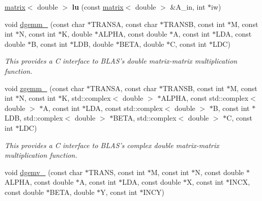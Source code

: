 \begin{DoxyCompactItemize}
\item 
\hypertarget{namespacekeycpp_ac6ada4f2aa379b6d31cf0a4e1453f809}{\hyperlink{classkeycpp_1_1matrix}{matrix}$<$ double $>$ {\bfseries lu} (const \hyperlink{classkeycpp_1_1matrix}{matrix}$<$ double $>$ \&A\-\_\-in, int $\ast$iw)}\label{namespacekeycpp_ac6ada4f2aa379b6d31cf0a4e1453f809}

\item 
\hypertarget{namespacekeycpp_a16b58f47ed977cafdc96227468f5f10a}{void \hyperlink{namespacekeycpp_a16b58f47ed977cafdc96227468f5f10a}{dgemm\-\_\-} (const char $\ast$T\-R\-A\-N\-S\-A, const char $\ast$T\-R\-A\-N\-S\-B, const int $\ast$M, const int $\ast$N, const int $\ast$K, double $\ast$A\-L\-P\-H\-A, const double $\ast$A, const int $\ast$L\-D\-A, const double $\ast$B, const int $\ast$L\-D\-B, double $\ast$B\-E\-T\-A, double $\ast$C, const int $\ast$L\-D\-C)}\label{namespacekeycpp_a16b58f47ed977cafdc96227468f5f10a}

\begin{DoxyCompactList}\small\item\em This provides a C interface to B\-L\-A\-S's double matrix-\/matrix multiplication function. \end{DoxyCompactList}\item 
\hypertarget{namespacekeycpp_a29fb4e46ee1b9cce0fd8bc79a2490c72}{void \hyperlink{namespacekeycpp_a29fb4e46ee1b9cce0fd8bc79a2490c72}{zgemm\-\_\-} (const char $\ast$T\-R\-A\-N\-S\-A, const char $\ast$T\-R\-A\-N\-S\-B, const int $\ast$M, const int $\ast$N, const int $\ast$K, std\-::complex$<$ double $>$ $\ast$A\-L\-P\-H\-A, const std\-::complex$<$ double $>$ $\ast$A, const int $\ast$L\-D\-A, const std\-::complex$<$ double $>$ $\ast$B, const int $\ast$L\-D\-B, std\-::complex$<$ double $>$ $\ast$B\-E\-T\-A, std\-::complex$<$ double $>$ $\ast$C, const int $\ast$L\-D\-C)}\label{namespacekeycpp_a29fb4e46ee1b9cce0fd8bc79a2490c72}

\begin{DoxyCompactList}\small\item\em This provides a C interface to B\-L\-A\-S's complex double matrix-\/matrix multiplication function. \end{DoxyCompactList}\item 
\hypertarget{namespacekeycpp_af0676a4a89dbb63f09fc627c05e12699}{void \hyperlink{namespacekeycpp_af0676a4a89dbb63f09fc627c05e12699}{dgemv\-\_\-} (const char $\ast$T\-R\-A\-N\-S, const int $\ast$M, const int $\ast$N, const double $\ast$A\-L\-P\-H\-A, const double $\ast$A, const int $\ast$L\-D\-A, const double $\ast$X, const int $\ast$I\-N\-C\-X, const double $\ast$B\-E\-T\-A, double $\ast$Y, const int $\ast$I\-N\-C\-Y)}\label{namespacekeycpp_af0676a4a89dbb63f09fc627c05e12699}


\end{DoxyCompactItemize}
